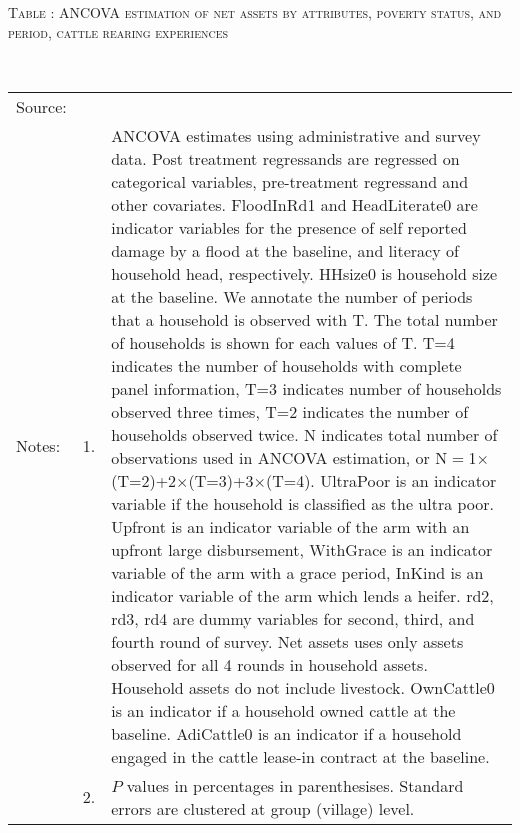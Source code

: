 \vspace{-1cm}\hspace{-1cm}\begin{minipage}[t]{14cm}
\hfil\textsc{\normalsize Table \thetable: ANCOVA estimation of net assets by attributes, poverty status, and period, cattle rearing experiences\label{tab ANCOVA narrow net assets Experience timevarying poverty status attributes}}\\
\setlength{\tabcolsep}{1pt}
\setlength{\baselineskip}{8pt}
\renewcommand{\arraystretch}{.52}
\hfil{}\\
\renewcommand{\arraystretch}{.8}
\setlength{\tabcolsep}{1pt}
\begin{tabular}{>{\hfill\scriptsize}p{1cm}<{}>{\hfill\scriptsize}p{.25cm}<{}>{\scriptsize}p{12cm}<{\hfill}}
Source:& \multicolumn{2}{l}{\scriptsize Estimated with GUK administrative and survey data.}\\
Notes: & 1. & ANCOVA estimates using administrative and survey data. Post treatment regressands are regressed on categorical variables, pre-treatment regressand and other covariates. \textsf{FloodInRd1} and \textsf{HeadLiterate0} are indicator variables for the presence of self reported damage by a flood at the baseline, and literacy of household head, respectively. \textsf{HHsize0} is household size at the baseline. We annotate the number of periods that a household is observed with \textsf{T}. The total number of households is shown for each values of \textsf{T}. \textsf{T=4} indicates the number of households with complete panel information, \textsf{T=3} indicates number of households observed three times, \textsf{T=2} indicates the number of households observed twice. \textsf{N} indicates total number of observations used in ANCOVA estimation, or \textsf{N$=$1$\times$(T=2)+2$\times$(T=3)+3$\times$(T=4)}.  \textsf{UltraPoor} is an indicator variable if the household is classified as the ultra poor. \textsf{Upfront} is an indicator variable of the arm with an upfront large disbursement, \textsf{WithGrace} is an indicator variable of the arm with a grace period, \textsf{InKind} is an indicator variable of the arm which lends a heifer. \textsf{rd2, rd3, rd4} are dummy variables for second, third, and fourth round of survey.  Net assets uses only assets observed for all 4 rounds in household assets. Household assets do not include livestock. \textsf{OwnCattle0} is an indicator if a household owned cattle at the baseline. \textsf{AdiCattle0} is an indicator if a household engaged in the cattle lease-in contract at the baseline.  \\
& 2. & $P$ values in percentages in parenthesises. Standard errors are clustered at group (village) level.
\end{tabular}
\end{minipage}

